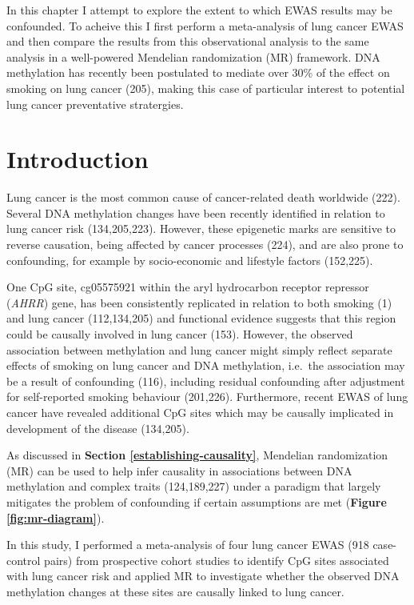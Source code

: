 \documentclass[11pt,oneside]{bristolthesis}
\begin{document}
In this chapter I attempt to explore the extent to which EWAS results may be confounded. To acheive this I first perform a meta-analysis of lung cancer EWAS and then compare the results from this observational analysis to the same analysis in a well-powered Mendelian randomization (MR) framework. DNA methylation has recently been postulated to mediate over 30\% of the effect on smoking on lung cancer (205), making this case of particular interest to potential lung cancer preventative stratergies.

\hypertarget{introduction-07}{%
\section{Introduction}\label{introduction-07}}

Lung cancer is the most common cause of cancer-related death worldwide (222). Several DNA methylation changes have been recently identified in relation to lung cancer risk (134,205,223). However, these epigenetic marks are sensitive to reverse causation, being affected by cancer processes (224), and are also prone to confounding, for example by socio-economic and lifestyle factors (152,225).

One CpG site, cg05575921 within the aryl hydrocarbon receptor repressor (\emph{AHRR}) gene, has been consistently replicated in relation to both smoking (1) and lung cancer (112,134,205) and functional evidence suggests that this region could be causally involved in lung cancer (153). However, the observed association between methylation and lung cancer might simply reflect separate effects of smoking on lung cancer and DNA methylation, i.e.~the association may be a result of confounding (116), including residual confounding after adjustment for self-reported smoking behaviour (201,226). Furthermore, recent EWAS of lung cancer have revealed additional CpG sites which may be causally implicated in development of the disease (134,205).

As discussed in \textbf{Section \ref{establishing-causality}}, Mendelian randomization (MR) can be used to help infer causality in associations between DNA methylation and complex traits (124,189,227) under a paradigm that largely mitigates the problem of confounding if certain assumptions are met (\textbf{Figure \ref{fig:mr-diagram}}).

In this study, I performed a meta-analysis of four lung cancer EWAS (918 case-control pairs) from prospective cohort studies to identify CpG sites associated with lung cancer risk and applied MR to investigate whether the observed DNA methylation changes at these sites are causally linked to lung cancer.
\end{document}
